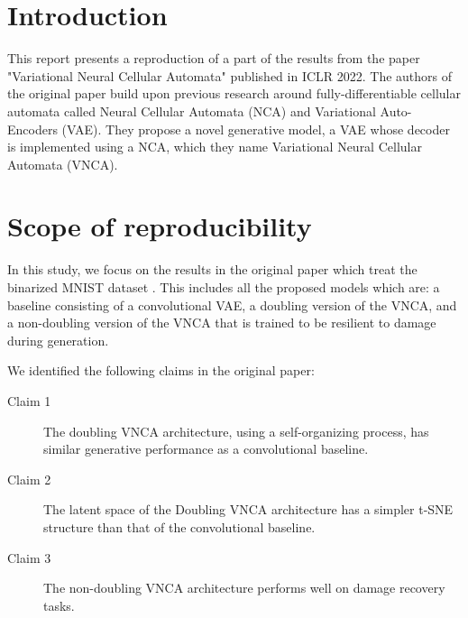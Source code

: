 \section{Introduction}


This report presents a reproduction of a part of the results from the paper "Variational Neural Cellular Automata" \cite{palm2022variational} published in ICLR 2022. The authors of the original paper build upon previous research around fully-differentiable cellular automata called Neural Cellular Automata (NCA) and Variational Auto-Encoders (VAE). They propose a novel generative model, a VAE whose decoder is implemented using a NCA, which they name Variational Neural Cellular Automata (VNCA). 


\section{Scope of reproducibility}
\label{sec:claims}

In this study, we focus on the results in the original paper which treat the binarized MNIST dataset \cite{binarizedMNIST}. This includes all the proposed models which are: a baseline consisting of a convolutional VAE, a doubling version of the VNCA, and a non-doubling version of the VNCA that is trained to be resilient to damage during generation.

We identified the following claims in the original paper:
\begin{description}
    \item [Claim 1] The doubling VNCA architecture, using a self-organizing process, has similar generative performance as a convolutional baseline.
    \item [Claim 2] The latent space of the Doubling VNCA architecture has a simpler t-SNE structure than that of the convolutional baseline.
    \item [Claim 3] The non-doubling VNCA architecture performs well on damage recovery tasks.
\end{description}

